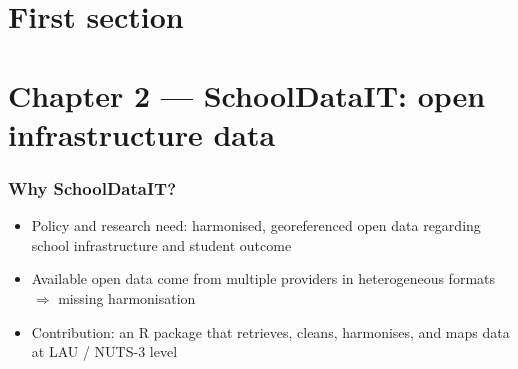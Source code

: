 \documentclass[13pt ]{beamer}
\begin{document}
\section{First section}

\section{Chapter 2 --- SchoolDataIT: open infrastructure data}

\begin{frame}
\frametitle{Why SchoolDataIT?}
\begin{itemize}
  \item Policy and research need: harmonised, georeferenced open data regarding school infrastructure and student outcome
  \item Available open data come from multiple providers in heterogeneous formats $\Rightarrow$ missing harmonisation
  \item Contribution: an R package that retrieves, cleans, harmonises, and maps data at LAU / NUTS-3 level
\end{itemize}
\end{frame}


\begin{frame}
     \printbibliography
 \end{frame} 
\end{document}
